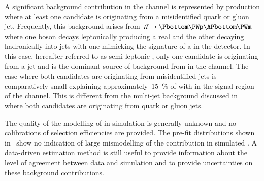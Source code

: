 


A significant background contribution in the \hadhad channel is
represented by \ttbar production where at least one \tauhadvis
candidate is originating from a misidentified quark or gluon
jet. Frequently, this background arises
from~$\ttbar \ra \Pbottom \PWp \APbottom \PWm$ where one \PW boson
decays leptonically producing a real \tauhad and the other decaying
hadronically into jets with one mimicking the signature of a
\tauhadvis in the detector. In this case, hereafter referred to as
semi-leptonic \ttbar, only one \tauhadvis candidate is originating
from a jet and is the dominant source of \faketauhadvis background
from \ttbar in the \hadhad channel. The case where both \tauhadvis
candidates are originating from misidentified jets is comparatively
small explaining approximately~\SI{15}{\percent} of \ttbar with
\faketauhadvis in the signal region of the \hadhad channel. This is
different from the multi-jet background discussed
in~ where both \tauhadvis candidates are
originating from quark or gluon jets.


The quality of the modelling of \faketauhadvis in simulation is
generally unknown and no calibrations of selection efficiencies are
provided. The pre-fit distributions shown
in~ show no
indication of large mismodelling of the \faketauhadvis contribution in
simulated \ttbar. A data-driven estimation method is still useful to
provide information about the level of agreement between data and
simulation and to provide uncertainties on these background
contributions.

